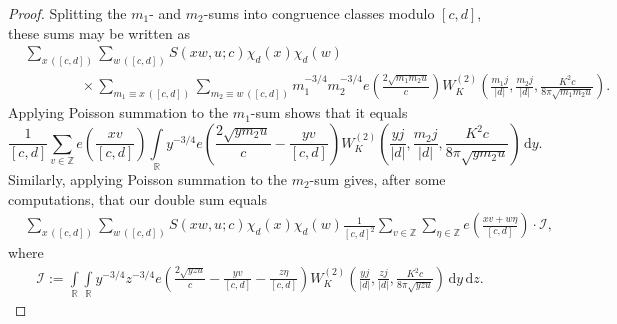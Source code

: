 \documentclass[a4paper,10pt,twoside]{amsart}
\theoremstyle{definition}
\numberwithin{equation}{section}
\newcommand\Z{\mathbb{Z}}
\renewcommand\:{\colon}
\begin{document}
\begin{proof}
Splitting the $m_1$- and $m_2$-sums into congruence classes modulo $[c,d]$, these sums may be written as
\begin{align}\label{division-to-congruence-classes}
&\sum_{x\,([c,d])}\sum_{w\,([c,d])}S(xw,u;c)\chi_d(x)\chi_d(w)\\
&\qquad\qquad\times\sum_{m_1\equiv x\,([c,d])}\sum_{m_2\equiv w\,([c,d])}m_1^{-3/4}m_2^{-3/4}e\left(\frac{2\sqrt{m_1m_2u}}{c}\right)W_K^{(2)}\left(\frac{m_1j}{|d|},\frac {m_2j}{|d|},\frac{K^2c}{8\pi\sqrt{m_1m_2u}}\right)\nonumber.
\end{align}
Applying Poisson summation to the $m_1$-sum shows that it equals
\[\frac1{[c,d]}\sum_{v\in\Z} e\left(\frac{xv}{[c,d]}\right)\int\limits_{\mathbb R}y^{-3/4}e\left(\frac{2\sqrt{ym_2u}}{c}-\frac{yv}{[c,d]}\right)W_K^{(2)}\left(\frac {yj}{|d|},\frac{m_2j}{|d|},\frac{K^2c}{8\pi\sqrt{ym_2u}}\right)\,\mathrm d y.\]
Similarly, applying Poisson summation to the $m_2$-sum gives, after some computations, that our double sum equals
\begin{align*}
&\sum_{x\,([c,d])}\sum_{w\,([c,d])}S\left(xw,u;c\right)\chi_d(x)\chi_d(w)\frac1{[c,d]^2}\sum_{v\in\Z}\sum_{\eta\in\Z} e\left(\frac{xv+w\eta}{[c,d]}\right)\cdot\mathcal I,
\end{align*}
where 
\begin{align*}
\mathcal I:=\int\limits_{\mathbb R}\int\limits_{\mathbb R}y^{-3/4}z^{-3/4}e\left(\frac{2\sqrt{yzu}}{c}-\frac{yv}{[c,d]}-\frac{z\eta}{[c,d]}\right)W_K^{(2)}\left(\frac {yj}{|d|},\frac{zj}{|d|},\frac{K^2c}{8\pi\sqrt{yzu}}\right)\,\mathrm d y\,\mathrm d z.
\end{align*}


\end{proof}
\end{document}

